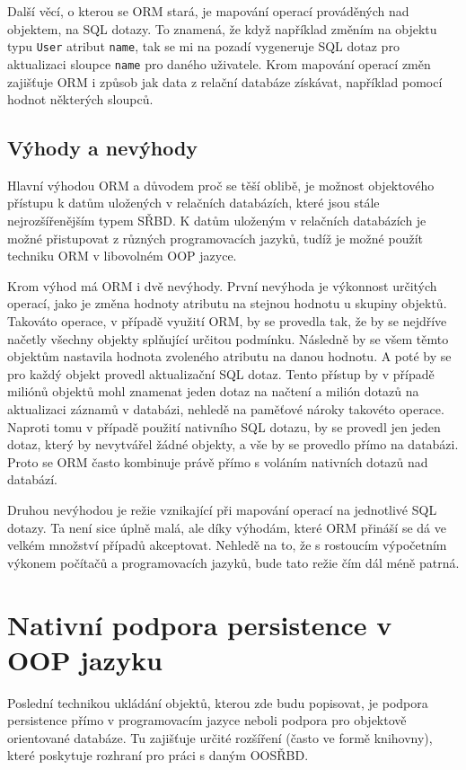 Další věcí, o kterou se ORM stará, je mapování operací prováděných nad objektem, na SQL dotazy. To znamená, že když například změním na objektu typu \texttt{User} atribut \texttt{name}, tak se mi na pozadí vygeneruje SQL dotaz pro aktualizaci sloupce \texttt{name} pro daného uživatele. Krom mapování operací změn zajišťuje ORM i způsob jak data z relační databáze získávat, například pomocí hodnot některých sloupců.
\subsection{Výhody a nevýhody}
Hlavní výhodou ORM a důvodem proč se těší oblibě, je možnost objektového přístupu k datům uložených v relačních databázích, které jsou stále nejrozšířenějším typem SŘBD. K datům uloženým v relačních databázích je možné přistupovat z různých programovacích jazyků, tudíž je možné použít techniku ORM v libovolném OOP jazyce.

Krom výhod má ORM i dvě nevýhody. První nevýhoda je výkonnost určitých operací, jako je změna hodnoty atributu na stejnou hodnotu u skupiny objektů. Takováto operace, v případě využití ORM, by se provedla tak, že by se nejdříve načetly všechny objekty splňující určitou podmínku. Následně by se všem těmto objektům nastavila hodnota zvoleného atributu na danou hodnotu. A poté by se pro každý objekt provedl aktualizační SQL dotaz. Tento přístup by v případě miliónů objektů mohl znamenat jeden dotaz na načtení a milión dotazů na aktualizaci záznamů v databázi, nehledě na paměťové nároky takovéto operace. Naproti tomu v případě použití nativního SQL dotazu, by se provedl jen jeden dotaz, který by nevytvářel žádné objekty, a vše by se provedlo přímo na databázi. Proto se ORM často kombinuje právě přímo s voláním nativních dotazů nad databází.

Druhou nevýhodou je režie vznikající při mapování operací na jednotlivé SQL dotazy. Ta není sice úplně malá, ale díky výhodám, které ORM přináší se dá ve velkém množství případů akceptovat. Nehledě na to, že s rostoucím výpočetním výkonem počítačů a programovacích jazyků, bude tato režie čím dál méně patrná.

\section{Nativní podpora persistence v OOP jazyku}
Poslední technikou ukládání objektů, kterou zde budu popisovat, je podpora persistence přímo v programovacím jazyce neboli podpora pro objektově orientované databáze. Tu zajišťuje určité rozšíření (často ve formě knihovny), které poskytuje rozhraní pro práci s daným OOSŘBD.

